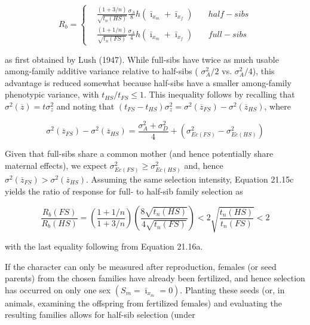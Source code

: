 \documentclass{article}
\begin{document}
\begin{equation}
R_{b}=\left\{\begin{aligned}&\frac{\left(1+3/n\right)}{\sqrt{t_{n}(HS)}}\frac{\sigma_{A}}{8}h\left(\bar{\imath}_{x_{m}}+\bar{\imath}_{x_{f}}\right)&\quad half-sibs\\ &\frac{\left(1+1/n\right)}{\sqrt{t_{n}(FS)}}\frac{\sigma_{A}}{4}h\left(\bar{\imath}_{x_{m}}+\bar{\imath}_{x_{f}}\right)&\quad full-sibs\end{aligned}\right.
\tag{21.15c}
\label{eq:21_15c}
\end{equation}

as first obtained by Lush (1947). While full-sibs have twice as much usable among-family additive variance relative to half-sibs ( $ \sigma_A^2/2 $ vs.  $ \sigma_A^2/4 $), this advantage is reduced somewhat because half-sibs have a smaller among-family phenotypic variance, with  $ t_{HS}/t_{FS} \leq 1 $. This inequality follows by recalling that  $ \sigma^2(\overline{z}) = t\sigma_z^2 $ and noting that  $ (t_{FS} - t_{HS})\sigma_z^2 = \sigma^2(\overline{z}_{FS}) - \sigma^2(\overline{z}_{HS}) $, where

\begin{equation}
\sigma^{2}(\overline{z}_{FS})-\sigma^{2}(\overline{z}_{HS})=\frac{\sigma_{A}^{2}+\sigma_{D}^{2}}{4}+\left(\sigma_{Ec(FS)}^{2}-\sigma_{Ec(HS)}^{2}\right)
\tag{21.16a}
\label{eq:21_16a}
\end{equation}

Given that full-sibs share a common mother (and hence potentially share maternal effects), we expect  $ \sigma_{Ec(FS)}^2 \geq \sigma_{Ec(HS)}^2 $ and, hence  $ \sigma^2(\overline{z}_{FS}) > \sigma^2(\overline{z}_{HS}) $. Assuming the same selection intensity, Equation 21.15c yields the ratio of response for full- to half-sib family selection as

\begin{equation}
\frac{R_{b}(FS)}{R_{b}(HS)}=\left(\frac{1+1/n}{1+3/n}\right)\left(\frac{8\sqrt{t_{n}(HS)}}{4\sqrt{t_{n}(FS)}}\right)<2\sqrt{\frac{t_{n}(HS)}{t_{n}(FS)}}<2
\tag{21.16b}
\label{eq:21_16b}
\end{equation}

with the last equality following from Equation 21.16a.

If the character can only be measured after reproduction, females (or seed parents) from the chosen families have already been fertilized, and hence selection has occurred on only one sex  $ (S_{m} = \bar{\imath}_{x_{m}} = 0) $. Planting these seeds (or, in animals, examining the offspring from fertilized females) and evaluating the resulting families allows for half-sib selection (under
\end{document}

